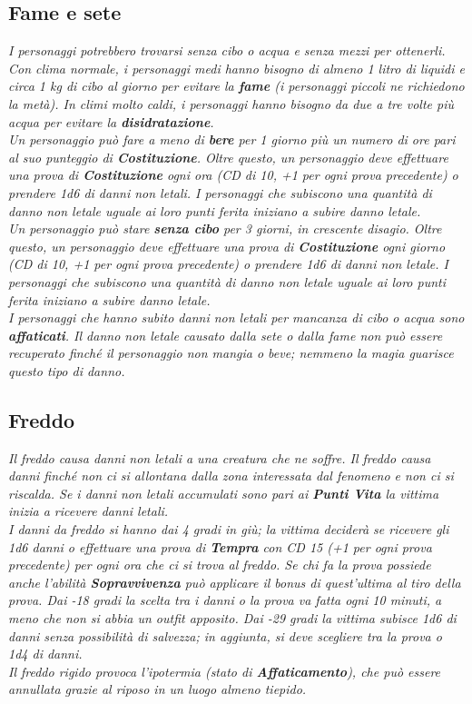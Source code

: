 		\subsection{Fame e sete}
			\emph{I personaggi potrebbero trovarsi senza cibo o acqua e senza mezzi per ottenerli. Con clima normale, i personaggi medi hanno bisogno di almeno 1 litro di liquidi e circa 1 kg di cibo al giorno per evitare la \textbf{fame} (i personaggi piccoli ne richiedono la metà). In climi molto caldi, i personaggi hanno bisogno da due a tre volte più acqua per evitare la \textbf{disidratazione}.\\
			Un personaggio può fare a meno di \textbf{bere} per 1 giorno più un numero di ore pari al suo punteggio di \textbf{Costituzione}. Oltre questo, un personaggio deve effettuare una prova di \textbf{Costituzione} ogni ora (CD di 10, +1 per ogni prova precedente) o prendere \textit{1d6} di danni non letali. I personaggi che subiscono una quantità di danno non letale uguale ai loro punti ferita iniziano a subire danno letale.\\
			Un personaggio può stare \textbf{senza cibo} per 3 giorni, in crescente disagio. Oltre questo, un personaggio deve effettuare una prova di \textbf{Costituzione} ogni giorno (CD di 10, +1 per ogni prova precedente) o prendere \textit{1d6} di danni non letale. I personaggi che subiscono una quantità di danno non letale uguale ai loro punti ferita iniziano a subire danno letale.\\
			I personaggi che hanno subito danni non letali per mancanza di cibo o acqua sono \textbf{affaticati}. Il danno non letale causato dalla sete o dalla fame non può essere recuperato finché il personaggio non mangia o beve; nemmeno la magia guarisce questo tipo di danno.}
	
		\subsection{Freddo}
			\emph{Il freddo causa danni non letali a una creatura che ne soffre. Il freddo causa danni finché non ci si allontana dalla zona interessata dal fenomeno e non ci si riscalda. Se i danni non letali accumulati sono pari ai \textbf{Punti Vita} la vittima inizia a ricevere danni letali.\\
			I danni da freddo si hanno dai 4 gradi in giù; la vittima deciderà se ricevere gli \textit{1d6} danni o effettuare una prova di \textbf{Tempra} con CD 15 (+1 per ogni prova precedente) per ogni ora che ci si trova al freddo. Se chi fa la prova possiede anche l'abilità \textbf{Sopravvivenza} può applicare il bonus di quest'ultima al tiro della prova. Dai -18 gradi la scelta tra i danni o la prova va fatta ogni 10 minuti, a meno che non si abbia un outfit apposito. Dai -29 gradi la vittima subisce \textit{1d6} di danni senza possibilità di salvezza; in aggiunta, si deve scegliere tra la prova o \textit{1d4} di danni.\\
			Il freddo rigido provoca l'ipotermia (stato di \textbf{Affaticamento}), che può essere annullata grazie al riposo in un luogo almeno tiepido.}
